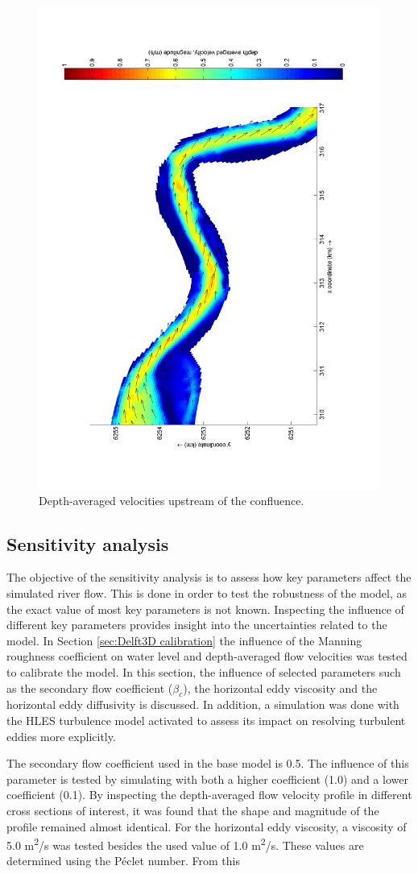 \begin{figure}[H]
    \centering
    \includegraphics[width=0.8\linewidth, angle=270]{figures/ch7/dav_upstream_bends.jpg}
    \caption{Depth-averaged velocities upstream of the confluence.}
    \label{fig:dav bends}
\end{figure}

\subsection{Sensitivity analysis}
\label{Sensitivity analysis}
The objective of the sensitivity analysis is to assess how key parameters affect the simulated river flow. This is done in order to test the robustness of the model, as the exact value of most key parameters is not known. Inspecting the influence of different key parameters provides insight into the uncertainties related to the model. In Section \ref{sec:Delft3D calibration} the influence of the Manning roughness coefficient on water level and depth-averaged flow velocities was tested to calibrate the model. In this section, the influence of selected parameters such as the secondary flow coefficient ($\beta_c$), the horizontal eddy viscosity and the horizontal eddy diffusivity is discussed. In addition, a simulation was done with the HLES turbulence model activated to assess its impact on resolving turbulent eddies more explicitly. 

The secondary flow coefficient used in the base model is 0.5. The influence of this parameter is tested by simulating with both a higher coefficient (1.0) and a lower coefficient (0.1). By inspecting the depth-averaged flow velocity profile in different cross sections of interest, it was found that the shape and magnitude of the profile remained almost identical. For the horizontal eddy viscosity, a viscosity of 5.0 m\textsuperscript{2}/s was tested besides the used value of 1.0 m\textsuperscript{2}/s. These values are determined using the Péclet number. From this 
